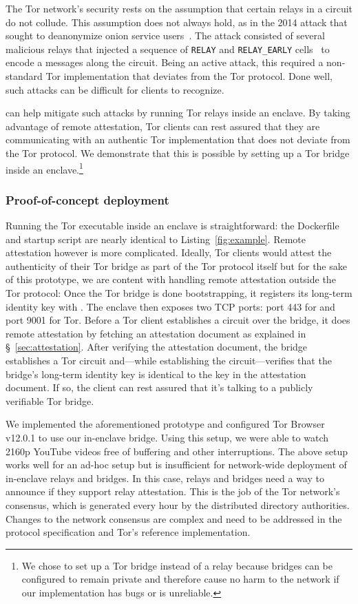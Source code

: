 The Tor network's security rests on the assumption that certain relays in a
circuit do not collude.  This assumption does not always hold, as in the 2014
attack that sought to deanonymize onion service users~\cite{Dingledine2015a}.
The attack consisted of several malicious relays that injected a sequence of
\texttt{RELAY} and \texttt{RELAY\_EARLY} cells~\cite[\S~5.6]{tor-spec} to encode
a messages along the circuit.  Being an active attack, this required a
non-standard Tor implementation that deviates from the Tor protocol.  Done well,
such attacks can be difficult for clients to recognize.

\Tool{} can help mitigate such attacks by running Tor relays inside an enclave.
By taking advantage of remote attestation, Tor clients can rest assured that
they are communicating with an authentic Tor implementation that does not
deviate from the Tor protocol.  We demonstrate that this is possible by setting
up a Tor bridge inside an enclave.\footnote{We chose to set up a Tor bridge
instead of a relay because bridges can be configured to remain private and
therefore cause no harm to the network if our implementation has bugs or is
unreliable.}

\subsubsection{Proof-of-concept deployment}

Running the Tor executable inside an enclave is straightforward: the Dockerfile
and startup script are nearly identical to Listing~\ref{fig:example}.  Remote
attestation however is more complicated.  Ideally, Tor clients would attest the
authenticity of their Tor bridge as part of the Tor protocol itself but for the
sake of this prototype, we are content with handling remote attestation outside
the Tor protocol: Once the Tor bridge is done bootstrapping, it registers
its long-term identity key with \tool{}.  The enclave then exposes two TCP
ports: port 443 for \tool{} and port 9001 for Tor.  Before a Tor client
establishes a circuit over the bridge, it does remote attestation by fetching
an attestation document as explained in \S~\ref{sec:attestation}.  After
verifying the attestation document, the bridge establishes a Tor circuit
and---while establishing the circuit---verifies that the bridge's long-term
identity key is identical to the key in the attestation document.  If so, the
client can rest assured that it's talking to a publicly verifiable Tor bridge.

We implemented the aforementioned prototype and configured Tor Browser v12.0.1
to use our in-enclave bridge.  Using this setup, we were able to watch 2160p
YouTube videos free of buffering and other interruptions.
%
The above setup works well for an ad-hoc setup but is insufficient for
network-wide deployment of in-enclave relays and bridges.  In this case, relays
and bridges need a way to announce if they support relay attestation.  This is
the job of the Tor network's consensus, which is generated every hour by the
distributed directory authorities.  Changes to the network consensus are
complex and need to be addressed in the protocol specification and Tor's
reference implementation.

